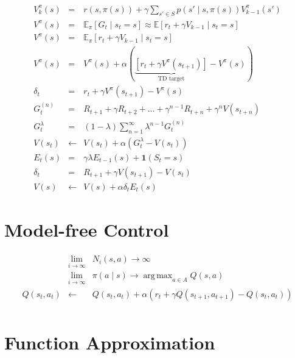 \documentclass[]{article}
\DeclareMathOperator*{\argmax}{arg\,max}
\begin{document}
\begin{eqnarray}
     V^\pi_k (s) &=& r(s, \pi(s)) + \gamma \sum_{s' \in S} p(s' \mid s, \pi(s)) V^\pi_{k-1} (s') \\
     V^\pi (s) &=& \mathbb{E}_\pi [G_t \mid s_t = s] \approx \mathbb{E} [r_t + \gamma V_{k-1} \mid s_t = s]\\
     V^\pi (s) &=& \mathbb{E}_\pi [r_t + \gamma V_{k-1} \mid s_t = s]\\
     V^\pi(s) &=& V^\pi(s) + \alpha (\underbrace{[r_t + \gamma V^\pi (s_{t+1})]}_{\text{TD target}} - V^\pi(s))\\
     \delta_t &=& r_t + \gamma V^\pi(s_{t+1}) - V^\pi (s)\\
     G_t^{(n)} &=&  R_{t+1} + \gamma R_{t+2} + \ldots + \gamma^{n-1} R_{t+n} + \gamma^n V(s_{t+n})\\
     G_t^\lambda &=& (1-\lambda) \sum_{n=1}^{\infty} \lambda^{n-1} G_t^{(n)}\\
     V(s_t) &\gets& V(s_t) + \alpha \left(G_t^\lambda - V(s_t)\right)\\
     E_t(s) &=& \gamma \lambda E_{t-1}(s) + \mathbf{1}(S_t=s)\\
     \delta_t &=& R_{t+1} + \gamma V(s_{t+1}) - V(s_t)\\
	V(s) &\gets& V(s) + \alpha \delta_t E_t(s)
\end{eqnarray}


\section{Model-free Control}
\begin{eqnarray}
      &\lim_{i\to\infty}& N_i(s,a) \to \infty\\
      &\lim_{i\to \infty}& \pi(a\mid s) \to \argmax_{a\in A} Q(s,a)\\
      Q(s_t,a_t) &\gets& Q(s_t, a_t) + \alpha (r_t + \gamma Q(s_{t+1}, a_{t+1}) - Q(s_t, a_t))\\
\end{eqnarray}

\section{Function Approximation}
\end{document}
